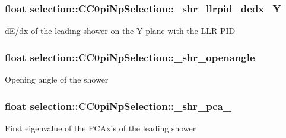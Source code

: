 \subsubsection[{\texorpdfstring{\+\_\+shr\+\_\+llrpid\+\_\+dedx\+\_\+Y}{_shr_llrpid_dedx_Y}}]{\setlength{\rightskip}{0pt plus 5cm}float selection\+::\+C\+C0pi\+Np\+Selection\+::\+\_\+shr\+\_\+llrpid\+\_\+dedx\+\_\+Y\hspace{0.3cm}{\ttfamily [private]}}\hypertarget{classselection_1_1CC0piNpSelection_a17acfa1b5d6a4d3f5c382c3f320fda83}{}\label{classselection_1_1CC0piNpSelection_a17acfa1b5d6a4d3f5c382c3f320fda83}
d\+E/dx of the leading shower on the Y plane with the L\+LR P\+ID 
\subsubsection[{\texorpdfstring{\+\_\+shr\+\_\+openangle}{_shr_openangle}}]{\setlength{\rightskip}{0pt plus 5cm}float selection\+::\+C\+C0pi\+Np\+Selection\+::\+\_\+shr\+\_\+openangle\hspace{0.3cm}{\ttfamily [private]}}\hypertarget{classselection_1_1CC0piNpSelection_a33b26acb3cdb05cb1b81800d8af48a03}{}\label{classselection_1_1CC0piNpSelection_a33b26acb3cdb05cb1b81800d8af48a03}
Opening angle of the shower 
\subsubsection[{\texorpdfstring{\+\_\+shr\+\_\+pca\+\_\+0}{_shr_pca_0}}]{\setlength{\rightskip}{0pt plus 5cm}float selection\+::\+C\+C0pi\+Np\+Selection\+::\+\_\+shr\+\_\+pca\+\_\hspace{0.3cm}{\ttfamily [private]}}\hypertarget{classselection_1_1CC0piNpSelection_a47b08d4ae98f51032f431873321914a5}{}\label{classselection_1_1CC0piNpSelection_a47b08d4ae98f51032f431873321914a5}
First eigenvalue of the P\+C\+Axis of the leading shower 
